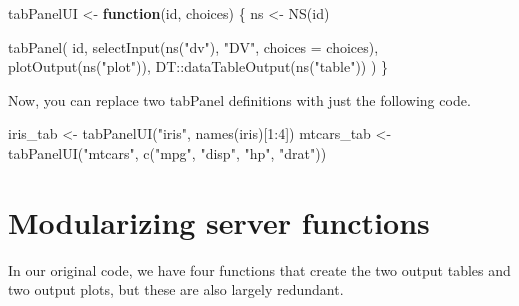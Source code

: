 \documentclass[
]{book}
\newenvironment{Shaded}{\begin{snugshade}}{\end{snugshade}}
\newcommand{\AttributeTok}[1]{\textcolor[rgb]{0.77,0.63,0.00}{#1}}
\newcommand{\ControlFlowTok}[1]{\textcolor[rgb]{0.13,0.29,0.53}{\textbf{#1}}}
\newcommand{\DecValTok}[1]{\textcolor[rgb]{0.00,0.00,0.81}{#1}}
\newcommand{\FunctionTok}[1]{\textcolor[rgb]{0.00,0.00,0.00}{#1}}
\newcommand{\NormalTok}[1]{#1}
\newcommand{\OtherTok}[1]{\textcolor[rgb]{0.56,0.35,0.01}{#1}}
\newcommand{\SpecialCharTok}[1]{\textcolor[rgb]{0.00,0.00,0.00}{#1}}
\newcommand{\StringTok}[1]{\textcolor[rgb]{0.31,0.60,0.02}{#1}}
\begin{document}
\begin{Shaded}
\begin{Highlighting}[]
\NormalTok{tabPanelUI }\OtherTok{\textless{}{-}} \ControlFlowTok{function}\NormalTok{(id, choices) \{}
\NormalTok{    ns }\OtherTok{\textless{}{-}} \FunctionTok{NS}\NormalTok{(id)}
    
    \FunctionTok{tabPanel}\NormalTok{(}
\NormalTok{        id,}
        \FunctionTok{selectInput}\NormalTok{(}\FunctionTok{ns}\NormalTok{(}\StringTok{"dv"}\NormalTok{), }\StringTok{"DV"}\NormalTok{, }\AttributeTok{choices =}\NormalTok{ choices),}
        \FunctionTok{plotOutput}\NormalTok{(}\FunctionTok{ns}\NormalTok{(}\StringTok{"plot"}\NormalTok{)),}
\NormalTok{        DT}\SpecialCharTok{::}\FunctionTok{dataTableOutput}\NormalTok{(}\FunctionTok{ns}\NormalTok{(}\StringTok{"table"}\NormalTok{))}
\NormalTok{    )}
\NormalTok{\}}
\end{Highlighting}
\end{Shaded}

Now, you can replace two tabPanel definitions with just the following code.

\begin{Shaded}
\begin{Highlighting}[]
\NormalTok{iris\_tab }\OtherTok{\textless{}{-}} \FunctionTok{tabPanelUI}\NormalTok{(}\StringTok{"iris"}\NormalTok{, }\FunctionTok{names}\NormalTok{(iris)[}\DecValTok{1}\SpecialCharTok{:}\DecValTok{4}\NormalTok{])}
\NormalTok{mtcars\_tab }\OtherTok{\textless{}{-}} \FunctionTok{tabPanelUI}\NormalTok{(}\StringTok{"mtcars"}\NormalTok{, }\FunctionTok{c}\NormalTok{(}\StringTok{"mpg"}\NormalTok{, }\StringTok{"disp"}\NormalTok{, }\StringTok{"hp"}\NormalTok{, }\StringTok{"drat"}\NormalTok{))}
\end{Highlighting}
\end{Shaded}

\hypertarget{modularizing-server-functions}{%
\section{Modularizing server functions}\label{modularizing-server-functions}}

In our original code, we have four functions that create the two output tables and two output plots, but these are also largely redundant.
\end{document}
